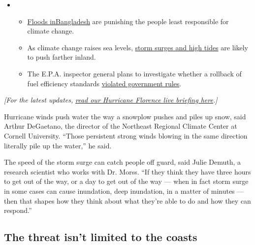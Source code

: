 \begin{itemize}
\item
  \begin{itemize}
  \tightlist
  \item
    \href{https://www.nytimes.com/2020/07/30/climate/bangladesh-floods.html?action=click\&pgtype=Article\&state=default\&region=MAIN_CONTENT_1\&context=storylines_keepup}{Floods
    in}\href{https://www.nytimes.com/2020/07/30/climate/bangladesh-floods.html?action=click\&pgtype=Article\&state=default\&region=MAIN_CONTENT_1\&context=storylines_keepup}{Bangladesh}
    are punishing the people least responsible for climate change.
  \item
    As climate change raises sea levels,
    \href{https://www.nytimes.com/2020/07/30/climate/sea-level-inland-floods.html?action=click\&pgtype=Article\&state=default\&region=MAIN_CONTENT_1\&context=storylines_keepup}{storm
    surges and high tides} are likely to push farther inland.
  \item
    The E.P.A. inspector general plans to investigate whether a rollback
    of fuel efficiency standards
    \href{https://www.nytimes.com/2020/07/27/climate/trump-fuel-efficiency-rule.html?action=click\&pgtype=Article\&state=default\&region=MAIN_CONTENT_1\&context=storylines_keepup}{violated
    government rules}.
  \end{itemize}
\end{itemize}

\emph{{[}For the latest updates,}
\href{https://www.nytimes.com/2018/09/11/us/hurricane-florence-updates.html}{\emph{read
our Hurricane Florence live briefing here}}\emph{.{]}}

Hurricane winds push water the way a snowplow pushes and piles up snow,
said Arthur DeGaetano, the director of the Northeast Regional Climate
Center at Cornell University. ``Those persistent strong winds blowing in
the same direction literally pile up the water,'' he said.

The speed of the storm surge can catch people off guard, said Julie
Demuth, a research scientist who works with Dr. Morss. ``If they think
they have three hours to get out of the way, or a day to get out of the
way --- when in fact storm surge in some cases can cause inundation,
deep inundation, in a matter of minutes --- then that shapes how they
think about what they're able to do and how they can respond.''

\hypertarget{the-threat-isnt-limited-to-the-coasts}{%
\subsection{The threat isn't limited to the
coasts}\label{the-threat-isnt-limited-to-the-coasts}}

